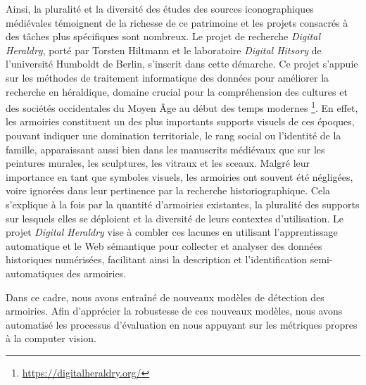 \documentclass[12pt,twoside]{book}
\begin{document}
Ainsi, la pluralité et la diversité des études des sources iconographiques médiévales témoignent de la richesse de ce patrimoine et les projets consacrés à des tâches plus spécifiques sont nombreux. Le projet de recherche \textit{Digital Heraldry}, porté par Torsten Hiltmann et le laboratoire \textit{Digital Hitsory} de l’université Humboldt de Berlin, s’inscrit dans cette démarche. Ce projet s’appuie sur les méthodes de traitement informatique des données pour améliorer la recherche en héraldique, domaine crucial pour la compréhension des cultures et des sociétés occidentales du Moyen Âge au début des temps modernes \footnote{\url{https://digitalheraldry.org/}}. En effet, les armoiries constituent un des plus importants supports visuels de ces époques, pouvant indiquer une domination territoriale, le rang social ou l’identité de la famille, apparaissant aussi bien dans les manuscrits médiévaux que sur les peintures murales, les sculptures, les vitraux et les sceaux. Malgré leur importance en tant que symboles visuels, les armoiries ont souvent été négligées, voire ignorées dans leur pertinence par la recherche historiographique. Cela s’explique à la fois par la quantité d’armoiries existantes, la pluralité des supports sur lesquels elles se déploient et la diversité de leurs contextes d'utilisation. Le projet \textit{Digital Heraldry} vise à combler ces lacunes en utilisant l'apprentissage automatique et le Web sémantique pour collecter et analyser des données historiques numérisées, facilitant ainsi la description et l'identification semi-automatiques des armoiries. 

Dans ce cadre, nous avons entraîné de nouveaux modèles de détection des armoiries. Afin d'apprécier la robustesse de ces nouveaux modèles, nous avons automatisé les processus d’évaluation en nous appuyant sur les métriques propres à la computer vision. 
\end{document}
